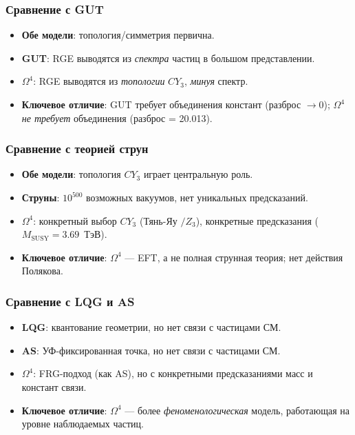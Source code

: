\documentclass[11pt,a4paper]{article}
\newcommand{\CY}{\ensuremath{CY_3}}
\newcommand{\Om}{\ensuremath{\Omega^4}}
\theoremstyle{definition}
\begin{document}
\subsubsection{Сравнение с GUT}

\begin{itemize}
    \item \textbf{Обе модели}: топология/симметрия первична.
    \item \textbf{GUT}: RGE выводятся из \emph{спектра} частиц
          в большом представлении.
    \item \textbf{$\Om$}: RGE выводятся из \emph{топологии}
          $\CY$, \emph{минуя} спектр.
    \item \textbf{Ключевое отличие}: GUT требует объединения
          констант (разброс $\to 0$); $\Om$ \emph{не требует}
          объединения (разброс = 20.013).
\end{itemize}

\subsubsection{Сравнение с теорией струн}

\begin{itemize}
    \item \textbf{Обе модели}: топология $\CY$ играет
          центральную роль.
    \item \textbf{Струны}: $10^{500}$ возможных вакуумов,
          нет уникальных предсказаний.
    \item \textbf{$\Om$}: конкретный выбор $\CY$ (Тянь-Яу $/Z_3$),
          конкретные предсказания ($M_{\text{SUSY}} = 3.69$~ТэВ).
    \item \textbf{Ключевое отличие}: $\Om$ --- EFT, а не полная
          струнная теория; нет действия Полякова.
\end{itemize}

\subsubsection{Сравнение с LQG и AS}

\begin{itemize}
    \item \textbf{LQG}: квантование геометрии, но нет связи
          с частицами СМ.
    \item \textbf{AS}: УФ-фиксированная точка, но нет связи
          с частицами СМ.
    \item \textbf{$\Om$}: FRG-подход (как AS), но с конкретными
          предсказаниями масс и констант связи.
    \item \textbf{Ключевое отличие}: $\Om$ --- более
          \emph{феноменологическая} модель, работающая
          на уровне наблюдаемых частиц.
\end{itemize}
\end{document}

